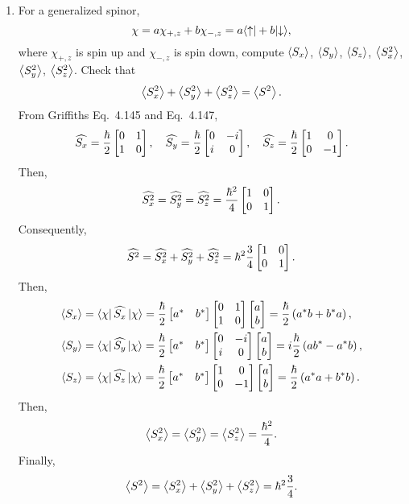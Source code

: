 \documentclass[a4paper, 12pt]{config/homework}
\begin{document}
\begin{enumerate}
\begin{enumerate}
\end{enumerate}
\pagebreak
\item For a generalized spinor,
\[\chi = a\chi_{+,z} + b\chi_{-,z} = a\bra*{\uparrow} + b\ket*{\downarrow},\]
where \(\chi_{+,z}\) is spin up and \(\chi_{-,z}\) is spin down, compute \(\left\langle S_x \right\rangle\), \(\left\langle S_y \right\rangle\), \(\left\langle S_z \right\rangle\), \(\left\langle S_x^2 \right\rangle\), \(\left\langle S_y^2 \right\rangle\), \(\left\langle S_z^2 \right\rangle\). Check that
\[\left\langle S_x^2 \right\rangle + \left\langle S_y^2 \right\rangle + \left\langle S_z^2 \right\rangle = \left\langle S^2 \right\rangle.\]
\bigskip
From Griffiths Eq.\ 4.145 and Eq.\ 4.147,
\[
\widehat{S_x} = \frac{\hbar}{2}\left[ \begin{matrix} 0 & 1 \\ 1 & 0 \end{matrix} \right], \quad
\widehat{S_y} = \frac{\hbar}{2}\left[ \begin{matrix} 0 & -i \\ i & 0 \end{matrix} \right], \quad
\widehat{S_z} = \frac{\hbar}{2}\left[ \begin{matrix} 1 & 0 \\ 0 & -1 \end{matrix} \right].
\]
Then,
\[
\widehat{S_x^2} = \widehat{S_y^2} = \widehat{S_z^2} = \frac{\hbar^2}{4}\left[ \begin{matrix} 1 & 0 \\ 0 & 1 \end{matrix} \right].
\]
Consequently,
\[
\widehat{S^2} = \widehat{S_x^2} + \widehat{S_y^2} + \widehat{S_z^2} = \hbar^2\frac{3}{4}\left[ \begin{matrix} 1 & 0 \\ 0 & 1 \end{matrix} \right].
\]
Then,
\begin{align*}
   \expval{S_x} &= \bra*{\chi}\,\widehat{S_x}\,\ket*{\chi} = \frac{\hbar}{2}\matr{a^* & b^*}\matr{0 & 1 \\ 1 & 0}\matr{a \\ b} = \frac{\hbar}{2}\left(a^*b + b^*a\right),
\\ \expval{S_y} &= \bra*{\chi}\,\widehat{S_y}\,\ket*{\chi} = \frac{\hbar}{2}\matr{a^* & b^*}\matr{0 & -i \\ i & 0}\matr{a \\ b} = i\frac{\hbar}{2}\left(ab^* - a^*b\right),
\\ \expval{S_z} &= \bra*{\chi}\,\widehat{S_z}\,\ket*{\chi} = \frac{\hbar}{2}\matr{a^* & b^*}\matr{1 & 0 \\ 0 & -1}\matr{a \\ b} = \frac{\hbar}{2}\left(a^*a + b^*b\right).
\end{align*}
Then,
\[\left\langle S_x^2 \right\rangle = \left\langle S_y^2 \right\rangle = \left\langle S_z^2 \right\rangle = \frac{\hbar^2}{4}.\]
Finally,
\[\left\langle S^2 \right\rangle = \left\langle S_x^2 \right\rangle + \left\langle S_y^2 \right\rangle + \left\langle S_z^2 \right\rangle = \hbar^2\frac{3}{4}.\]


\end{enumerate}
\end{document}
